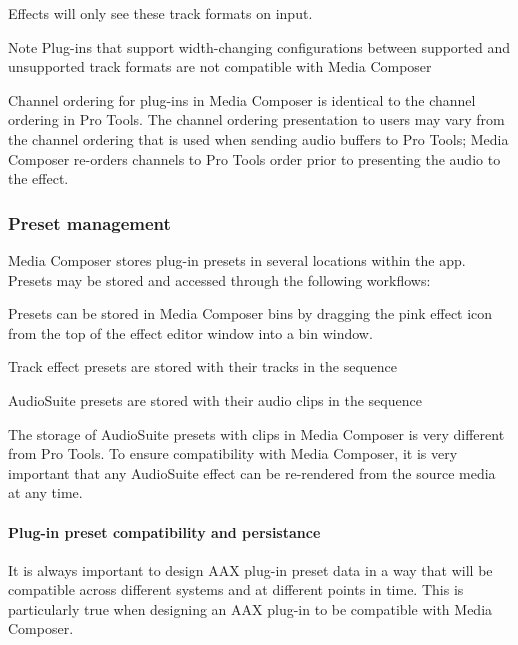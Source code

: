 Effects will only see these track formats on input.

\begin{DoxyNote}{Note}
Plug-\/ins that support width-\/changing configurations between supported and unsupported track formats are not compatible with Media Composer
\end{DoxyNote}
Channel ordering for plug-\/ins in Media Composer is identical to the channel ordering in Pro Tools. The channel ordering presentation to users may vary from the channel ordering that is used when sending audio buffers to Pro Tools; Media Composer re-\/orders channels to Pro Tools order prior to presenting the audio to the effect.

\hypertarget{a00831_subsection__aax_media_composer_guide__features__presets}{}\subsubsection{Preset management}\label{a00831_subsection__aax_media_composer_guide__features__presets}
 Media Composer stores plug-\/in presets in several locations within the app. Presets may be stored and accessed through the following workflows\+: 
\begin{DoxyItemize}
\item Presets can be stored in Media Composer bins by dragging the pink effect icon from the top of the effect editor window into a bin window.  
\item Track effect presets are stored with their tracks in the sequence  
\item Audio\+Suite presets are stored with their audio clips in the sequence  
\end{DoxyItemize}

The storage of Audio\+Suite presets with clips in Media Composer is very different from Pro Tools. To ensure compatibility with Media Composer, it is very important that any Audio\+Suite effect can be re-\/rendered from the source media at any time.

\hypertarget{a00831_subsubsection__aax_media_composer_guide__features__presets__persistence_notes}{}\paragraph{Plug-\/in preset compatibility and persistance}\label{a00831_subsubsection__aax_media_composer_guide__features__presets__persistence_notes}
 It is always important to design A\+AX plug-\/in preset data in a way that will be compatible across different systems and at different points in time. This is particularly true when designing an A\+AX plug-\/in to be compatible with Media Composer.

